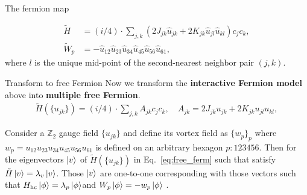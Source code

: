 \documentclass{beamer}
\begin{document}
\begin{frame}[allowframebreaks]{The fermion map}
\begin{theorem}
    \begin{align}
        \tilde H&= ({i}/{4})\cdot \sum_{j,k} (2J_{{jk}}\hat u_{jk} + 2K_{jk}\hat  u_{jl}\hat u_{kl}) c_j c_k,\label{eq:trans_Ham} \\
        \tilde W_p &= -\hat{u}_{12}\hat{u}_{23}\hat{u}_{34}\hat{u}_{45}\hat{u}_{56}\hat{u}_{61},\label{eq:conser_q}
    \end{align}  
    where $l$ is the unique mid-point of the second-nearest neighbor pair $(j,k)$.
\end{theorem}
\end{frame}

\begin{frame}{Transform to free Fermion}
Now we transform the \textbf{interactive Fermion model} above into \textbf{multiple free Fermion}.
\begin{align}\label{eq:free_ferm}
    \tilde H(\{u_{jk}\}) =  ({i}/{4})\cdot \sum_{j,k} A_{jk} c_j c_k, \quad A_{jk} = 2J_{{jk}}u_{jk} + 2K_{jk}u_{jl} u_{kl},
\end{align}
\begin{lemma}
    Consider a $\mathbb{Z}_2$ gauge field $\{u_{jk}\}$ and define its vortex field as $\{w_p\}_p$ where $w_p = u_{12}u_{23}u_{34}u_{45}u_{56}u_{61}$ is defined on an arbitrary hexagon $p:123456$. 
    Then for the eigenvectors $\ket{v}$ of $\tilde H(\{u_{jk}\})$ in Eq.~\eqref{eq:free_ferm} such that satisfy $\tilde H \ket{v} = \lambda_v \ket{v}$. Those $\ket{v}$ are one-to-one corresponding with those vectors such that $H_{\mathrm{hc}} \ket{\phi} = \lambda_{p} \ket{\phi}$and $W_p\ket{\phi} = -w_p \ket{\phi}$ . 
\end{lemma}
\end{frame}
\end{document}
